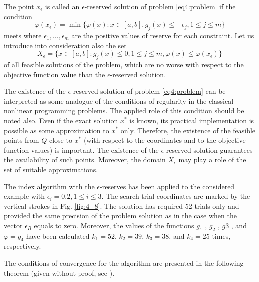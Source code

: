 \begin{definition}
  The point $x_\epsilon$ is called an $\epsilon$-reserved solution of problem \eqref{eq4:problem} if the condition
  \begin{equation}
    \label{eq4:eps_res_problem}
    \varphi(x_\epsilon)=\min\{\varphi(x):x\in [a,b], g_j(x)\le -\epsilon_j,1\le j\le m\}
  \end{equation}
  meets where $\epsilon_1, \dots,\epsilon_m$ are the positive values of reserve for each constraint. Let us introduce into consideration also the set
  \begin{equation}
    \label{eq4:x_epsilon}
    X_\epsilon = \{x\in[a,b]:g_j(x)\le 0, 1\le j\le m, \varphi(x)\le\varphi(x_\epsilon)\}
  \end{equation}
  of all feasible solutions of the problem, which are no worse with respect to the objective function value than the $\epsilon$-reserved solution.
\end{definition}

The existence of the $\epsilon$-reserved solution of problem \eqref{eq4:problem} can be interpreted as some analogue of the conditions of regularity in the classical nonlinear programming problems. The applied role of this condition should be noted also. Even if the exact solution $x^*$ is known, its practical implementation is possible as some approximation to $x^*$ only. Therefore, the existence of the feasible points from $Q$ close to $x^*$ (with respect to the coordinates and to the objective
function values) is important. The existence of the $\epsilon$-reserved solution guarantees the availability of such points. Moreover, the domain $X_\epsilon$ may play a role of the set of suitable approximations.

The index algorithm with the $\epsilon$-reserves has been applied to the considered example with $\epsilon_i=0.2, 1\le i\le 3$. The search trial coordinates are marked by the vertical strokes in Fig. \ref{fig:4_8}. The solution has required 52 trials only and provided the same precision of the problem solution as in
the case when the vector $\epsilon_R$ equals to zero. Moreover, the values of the functions $g_1$ , $g_2$ , $g 3$ , and $\varphi=g_4$ have been calculated $k_1 =52$, $k_2 =39$, $k_3 =38$, and $k_4 =25$ times, respectively.

The conditions of convergence for the algorithm are presented in the following theorem (given without proof, see \cite{}).

